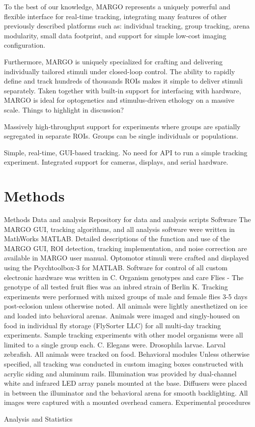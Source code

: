 \documentclass[10pt]{article}
\begin{document}
\begin{multicols}{2}
To the best of our knowledge, MARGO represents a uniquely powerful and flexible interface for real-time tracking, integrating many features of other previously described platforms such as: individual tracking, group tracking, arena modularity, small data footprint, and support for simple low-cost imaging configuration.

Furthermore, MARGO is uniquely  specialized for crafting and delivering individually tailored stimuli under closed-loop control. The ability to rapidly define and track hundreds of thousands ROIs makes it simple to deliver stimuli separately. Taken together with built-in support for interfacing with hardware, MARGO is ideal for optogenetics and stimulus-driven ethology on a massive scale.
Things to highlight in discussion?

Massively high-throughput support for experiments where groups are spatially segregated in separate ROIs. Groups can be single individuals or populations.

Simple, real-time, GUI-based tracking. No need for API to run a simple tracking experiment.
Integrated support for cameras, displays, and serial hardware.

\section{Methods}


Methods
Data and analysis
Repository for data and analysis scripts
Software
The MARGO GUI, tracking algorithms, and all analysis software were written in MathWorks MATLAB. Detailed descriptions of the function and use of the MARGO GUI, ROI detection, tracking implementation, and noise correction are available in MARGO user manual. Optomotor stimuli were crafted and displayed using the Psychtoolbox-3 for MATLAB. Software for control of all custom electronic hardware was written in C.
Organism genotypes and care
Flies - The genotype of all tested fruit flies was an inbred strain of  Berlin K. Tracking experiments were performed with mixed groups of male and female flies 3-5 days post-eclosion unless otherwise noted. All animals were lightly anesthetized on ice and loaded into behavioral arenas. Animals were imaged and singly-housed on food in individual fly storage (FlySorter LLC) for all multi-day tracking experiments. 
Sample tracking experiments with other model organisms were all limited to a single group each. C. Elegans were. Drosophila larvae. Larval zebrafish. All animals were tracked on food.
Behavioral modules
Unless otherwise specified, all tracking was conducted in custom imaging boxes constructed with acrylic siding and aluminum rails. Illumination was provided by dual-channel white and infrared LED array panels mounted at the base. Diffusers were placed in between the illuminator and the behavioral arena for smooth backlighting. All images were captured with a mounted overhead camera.
Experimental procedures


Analysis and Statistics

\end{multicols}
\end{document}
